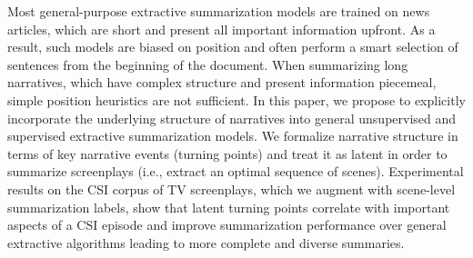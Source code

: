 Most general-purpose extractive summarization models are trained on news articles, which are short and present all important information upfront. As a result, such models are biased on position and often perform a smart selection of sentences from the beginning of the document. When summarizing long narratives, which have complex structure and present information piecemeal, simple position heuristics are not sufficient. In this paper, we propose to explicitly incorporate the underlying structure of narratives into general unsupervised and supervised extractive summarization models. We formalize narrative structure in terms of key narrative events (turning points) and treat it as latent in order to summarize screenplays (i.e., extract an optimal sequence of scenes). Experimental results on the CSI corpus of TV screenplays, which we augment with scene-level summarization labels, show that latent turning points correlate with important aspects of a CSI episode and improve summarization performance over general extractive algorithms leading to more complete and diverse summaries.
